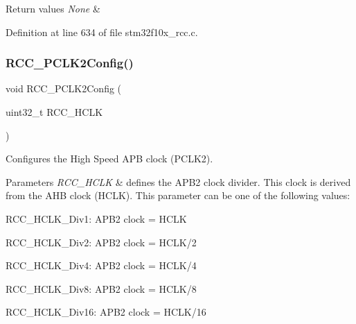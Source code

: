 \begin{DoxyRetVals}{Return values}
{\em None} & \\
\hline
\end{DoxyRetVals}


Definition at line 634 of file stm32f10x\+\_\+rcc.\+c.

\mbox{\label{group___r_c_c___exported___functions_ga09f9c010a4adca9e036da42c2ca6126a}} 
\subsubsection{\texorpdfstring{R\+C\+C\+\_\+\+P\+C\+L\+K2\+Config()}{RCC\_PCLK2Config()}}
{\footnotesize\ttfamily void R\+C\+C\+\_\+\+P\+C\+L\+K2\+Config (\begin{DoxyParamCaption}\item[{uint32\+\_\+t}]{R\+C\+C\+\_\+\+H\+C\+LK }\end{DoxyParamCaption})}



Configures the High Speed A\+PB clock (P\+C\+L\+K2). 


\begin{DoxyParams}{Parameters}
{\em R\+C\+C\+\_\+\+H\+C\+LK} & defines the A\+P\+B2 clock divider. This clock is derived from the A\+HB clock (H\+C\+LK). This parameter can be one of the following values\+: \begin{DoxyItemize}
\item R\+C\+C\+\_\+\+H\+C\+L\+K\+\_\+\+Div1\+: A\+P\+B2 clock = H\+C\+LK \item R\+C\+C\+\_\+\+H\+C\+L\+K\+\_\+\+Div2\+: A\+P\+B2 clock = H\+C\+L\+K/2 \item R\+C\+C\+\_\+\+H\+C\+L\+K\+\_\+\+Div4\+: A\+P\+B2 clock = H\+C\+L\+K/4 \item R\+C\+C\+\_\+\+H\+C\+L\+K\+\_\+\+Div8\+: A\+P\+B2 clock = H\+C\+L\+K/8 \item R\+C\+C\+\_\+\+H\+C\+L\+K\+\_\+\+Div16\+: A\+P\+B2 clock = H\+C\+L\+K/16 \end{DoxyItemize}
\\
\hline
\end{DoxyParams}

